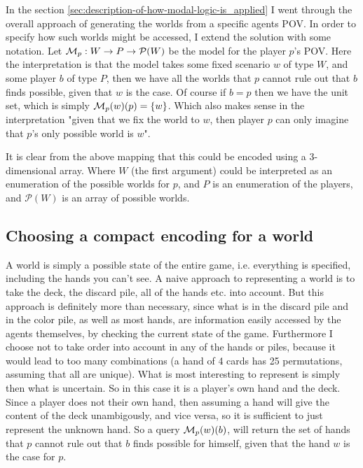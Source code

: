 In the section \ref{sec:description-of-how-modal-logic-is_applied} I went through the overall approach of generating the worlds from a specific agents POV. In order to specify how such worlds might be accessed, I extend the solution with some notation. Let $\mathcal{M}_p: W \rightarrow P \rightarrow \mathcal{P}(W)$ be the model for the player $p$'s POV. Here the interpretation is that the model takes some fixed scenario $w$ of type $W$, and some player $b$ of type $P$, then we have all the worlds that $p$ cannot rule out that $b$ finds possible, given that $w$ is the case. Of course if $b=p$ then we have the unit set, which is simply $\mathcal{M}_p(w)(p) = \{w\}$. Which also makes sense in the interpretation "given that we fix the world to $w$, then player $p$ can only imagine that $p$'s only possible world is $w$". 

It is clear from the above mapping that this could be encoded using a 3-dimensional array. Where $W$ (the first argument) could be interpreted as an enumeration of the possible worlds for $p$, and $P$ is an enumeration of the players, and $\mathcal{P}(W)$ is an array of possible worlds.




\subsection{Choosing a compact encoding for a world} \label{sec:representing-a-world}
A world is simply a possible state of the entire game, i.e. everything is specified, including the hands you can't see. A naive approach to representing a world is to take the deck, the discard pile, all of the hands etc. into account. But this approach is definitely more than necessary, since what is in the discard pile and in the color pile, as well as most hands, are information easily accessed by the agents themselves, by checking the current state of the game. Furthermore I choose not to take order into account in any of the hands or piles, because it would lead to too many combinations (a hand of 4 cards has 25 permutations, assuming that all are unique). What is most interesting to represent is simply then what is uncertain. So in this case it is a player's own hand and the deck. Since a player does not their own hand, then assuming a hand will give the content of the deck unambigously, and vice versa, so it is sufficient to just represent the unknown hand. So a query $\mathcal{M}_p(w)(b)$, will return the set of hands that $p$ cannot rule out that $b$ finds possible for himself, given that the hand $w$ is the case for $p$.

